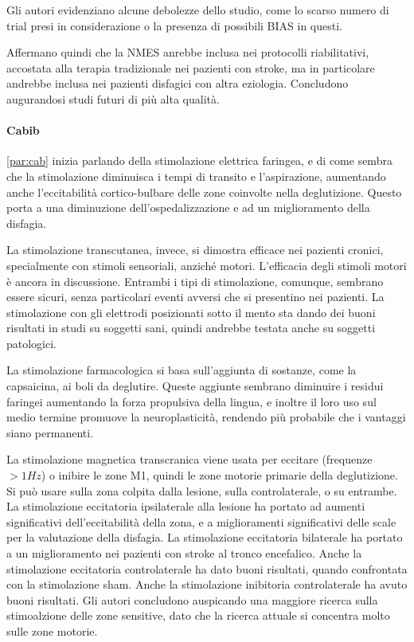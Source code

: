 Gli autori evidenziano alcune debolezze dello studio, come lo scarso numero di 
trial presi in considerazione o la presenza di possibili BIAS in questi.

Affermano quindi che la NMES anrebbe inclusa nei protocolli riabilitativi, 
accostata alla terapia tradizionale nei pazienti con stroke, ma in particolare 
andrebbe inclusa nei pazienti disfagici con altra eziologia.
Concludono augurandosi studi futuri di più alta qualità.

\paragraph{Cabib} \label{par:cab:stim} \ref{par:cab} inizia parlando della 
stimolazione elettrica faringea, e di come sembra che la stimolazione 
diminuisca i tempi di transito e l'aspirazione, aumentando anche l'eccitabilità 
cortico-bulbare delle zone coinvolte nella deglutizione.
Questo porta a una diminuzione dell'ospedalizzazione e ad un miglioramento 
della disfagia.

La stimolazione transcutanea, invece, si dimostra efficace nei pazienti 
cronici, specialmente con stimoli sensoriali, anziché motori.
L'efficacia degli stimoli motori è ancora in discussione.
Entrambi i tipi di stimolazione, comunque, sembrano essere sicuri, senza 
particolari eventi avversi che si presentino nei pazienti.
La stimolazione con gli elettrodi posizionati sotto il mento sta dando dei 
buoni risultati in studi su soggetti sani, quindi andrebbe testata anche su 
soggetti patologici.

La stimolazione farmacologica si basa sull'aggiunta di sostanze, come la 
capsaicina, ai boli da deglutire.
Queste aggiunte sembrano diminuire i residui faringei aumentando la forza 
propulsiva della lingua, e inoltre il loro uso sul medio termine promuove la 
neuroplasticità, rendendo più probabile che i vantaggi siano permanenti.

La stimolazione magnetica transcranica viene usata per eccitare (frequenze 
$>1Hz$) o inibire le zone M1, quindi le zone motorie primarie della 
deglutizione.
Si può usare sulla zona colpita dalla lesione, sulla controlaterale, o su 
entrambe.
La stimolazione eccitatoria ipsilaterale alla lesione ha portato ad aumenti 
significativi dell'eccitabilità della zona, e a miglioramenti significativi 
delle scale per la valutazione della disfagia.
La stimolazione eccitatoria bilaterale ha portato a un miglioramento nei 
pazienti con stroke al tronco encefalico.
Anche la stimolazione eccitatoria controlaterale ha dato buoni risultati, 
quando confrontata con la stimolazione sham.
Anche la stimolazione inibitoria controlaterale ha avuto buoni risultati.
Gli autori concludono auspicando una maggiore ricerca sulla stimoalzione delle 
zone sensitive, dato che la ricerca attuale si concentra molto sulle zone 
motorie.


